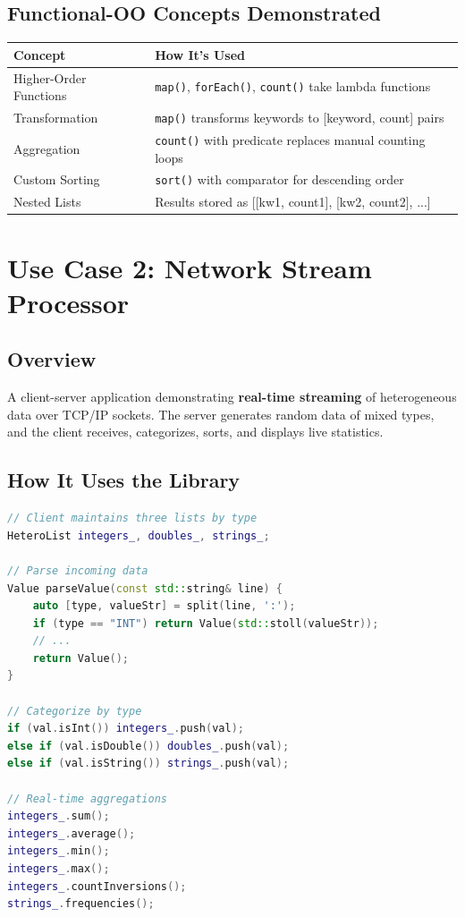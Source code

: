 \documentclass[11pt,a4paper]{article}
\begin{document}
\subsection{Functional-OO Concepts Demonstrated}

\begin{center}
\begin{tabular}{|l|p{9cm}|}
\hline
\textbf{Concept} & \textbf{How It's Used} \\
\hline
Higher-Order Functions & \texttt{map()}, \texttt{forEach()}, \texttt{count()} take lambda functions \\
Transformation & \texttt{map()} transforms keywords to [keyword, count] pairs \\
Aggregation & \texttt{count()} with predicate replaces manual counting loops \\
Custom Sorting & \texttt{sort()} with comparator for descending order \\
Nested Lists & Results stored as [[kw1, count1], [kw2, count2], ...] \\
\hline
\end{tabular}
\end{center}

\section{Use Case 2: Network Stream Processor}

\subsection{Overview}

A client-server application demonstrating \textbf{real-time streaming} of heterogeneous data over TCP/IP sockets. The server generates random data of mixed types, and the client receives, categorizes, sorts, and displays live statistics.

\subsection{How It Uses the Library}

\begin{lstlisting}[language=C++]
// Client maintains three lists by type
HeteroList integers_, doubles_, strings_;

// Parse incoming data
Value parseValue(const std::string& line) {
    auto [type, valueStr] = split(line, ':');
    if (type == "INT") return Value(std::stoll(valueStr));
    // ...
    return Value();
}

// Categorize by type
if (val.isInt()) integers_.push(val);
else if (val.isDouble()) doubles_.push(val);
else if (val.isString()) strings_.push(val);

// Real-time aggregations
integers_.sum();
integers_.average();
integers_.min();
integers_.max();
integers_.countInversions();
strings_.frequencies();
\end{lstlisting}
\end{document}
